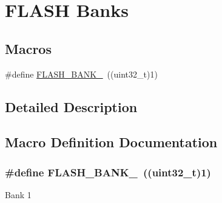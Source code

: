 \hypertarget{group___f_l_a_s_h_ex___banks}{}\section{F\+L\+A\+SH Banks}
\label{group___f_l_a_s_h_ex___banks}
\subsection*{Macros}
\begin{DoxyCompactItemize}
\item 
\#define \hyperlink{group___f_l_a_s_h_ex___banks_ga8ac3f24496e5de6a2f6bd3ff77f0ca53}{F\+L\+A\+S\+H\+\_\+\+B\+A\+N\+K\+\_}~((uint32\+\_\+t)1)
\end{DoxyCompactItemize}


\subsection{Detailed Description}


\subsection{Macro Definition Documentation}
\subsubsection[{\texorpdfstring{F\+L\+A\+S\+H\+\_\+\+B\+A\+N\+K\+\_\+1}{FLASH_BANK_1}}]{\setlength{\rightskip}{0pt plus 5cm}\#define F\+L\+A\+S\+H\+\_\+\+B\+A\+N\+K\+\_~((uint32\+\_\+t)1)}\hypertarget{group___f_l_a_s_h_ex___banks_ga8ac3f24496e5de6a2f6bd3ff77f0ca53}{}\label{group___f_l_a_s_h_ex___banks_ga8ac3f24496e5de6a2f6bd3ff77f0ca53}
Bank 1 
